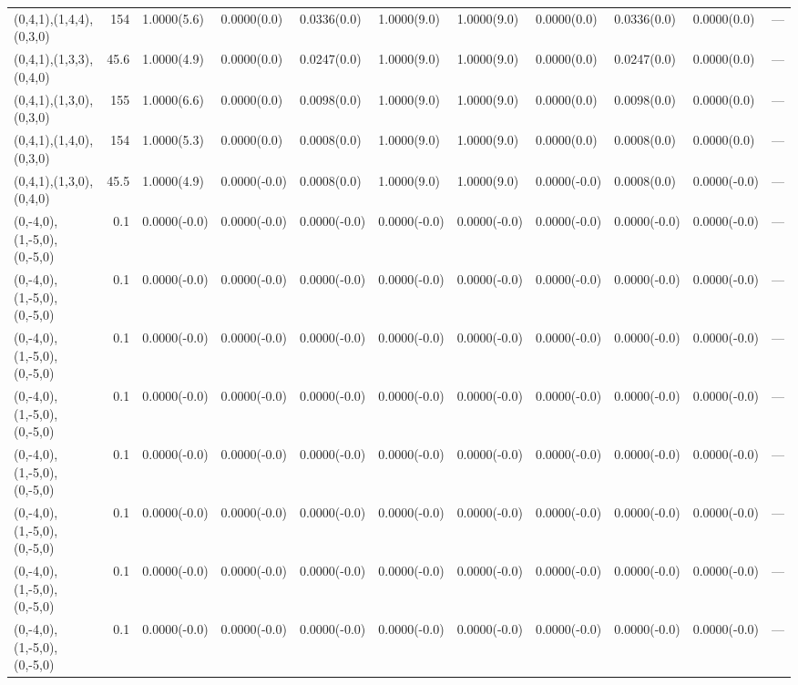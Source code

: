 \begin{tabular}{lrlllllllll}
 (0,4,1),(1,4,4),(0,3,0)    &  154   & 1.0000(5.6)  & 0.0000(0.0)  & 0.0336(0.0)  & 1.0000(9.0)    & 1.0000(9.0)  & 0.0000(0.0)    & 0.0336(0.0)  & 0.0000(0.0)  & ---    \\
 (0,4,1),(1,3,3),(0,4,0)    &   45.6 & 1.0000(4.9)  & 0.0000(0.0)  & 0.0247(0.0)  & 1.0000(9.0)    & 1.0000(9.0)  & 0.0000(0.0)    & 0.0247(0.0)  & 0.0000(0.0)  & ---    \\
 (0,4,1),(1,3,0),(0,3,0)    &  155   & 1.0000(6.6)  & 0.0000(0.0)  & 0.0098(0.0)  & 1.0000(9.0)    & 1.0000(9.0)  & 0.0000(0.0)    & 0.0098(0.0)  & 0.0000(0.0)  & ---    \\
 (0,4,1),(1,4,0),(0,3,0)    &  154   & 1.0000(5.3)  & 0.0000(0.0)  & 0.0008(0.0)  & 1.0000(9.0)    & 1.0000(9.0)  & 0.0000(0.0)    & 0.0008(0.0)  & 0.0000(0.0)  & ---    \\
 (0,4,1),(1,3,0),(0,4,0)    &   45.5 & 1.0000(4.9)  & 0.0000(-0.0) & 0.0008(0.0)  & 1.0000(9.0)    & 1.0000(9.0)  & 0.0000(-0.0)   & 0.0008(0.0)  & 0.0000(-0.0) & ---    \\
 (0,-4,0),(1,-5,0),(0,-5,0) &    0.1 & 0.0000(-0.0) & 0.0000(-0.0) & 0.0000(-0.0) & 0.0000(-0.0)   & 0.0000(-0.0) & 0.0000(-0.0)   & 0.0000(-0.0) & 0.0000(-0.0) & ---    \\
 (0,-4,0),(1,-5,0),(0,-5,0) &    0.1 & 0.0000(-0.0) & 0.0000(-0.0) & 0.0000(-0.0) & 0.0000(-0.0)   & 0.0000(-0.0) & 0.0000(-0.0)   & 0.0000(-0.0) & 0.0000(-0.0) & ---    \\
 (0,-4,0),(1,-5,0),(0,-5,0) &    0.1 & 0.0000(-0.0) & 0.0000(-0.0) & 0.0000(-0.0) & 0.0000(-0.0)   & 0.0000(-0.0) & 0.0000(-0.0)   & 0.0000(-0.0) & 0.0000(-0.0) & ---    \\
 (0,-4,0),(1,-5,0),(0,-5,0) &    0.1 & 0.0000(-0.0) & 0.0000(-0.0) & 0.0000(-0.0) & 0.0000(-0.0)   & 0.0000(-0.0) & 0.0000(-0.0)   & 0.0000(-0.0) & 0.0000(-0.0) & ---    \\
 (0,-4,0),(1,-5,0),(0,-5,0) &    0.1 & 0.0000(-0.0) & 0.0000(-0.0) & 0.0000(-0.0) & 0.0000(-0.0)   & 0.0000(-0.0) & 0.0000(-0.0)   & 0.0000(-0.0) & 0.0000(-0.0) & ---    \\
 (0,-4,0),(1,-5,0),(0,-5,0) &    0.1 & 0.0000(-0.0) & 0.0000(-0.0) & 0.0000(-0.0) & 0.0000(-0.0)   & 0.0000(-0.0) & 0.0000(-0.0)   & 0.0000(-0.0) & 0.0000(-0.0) & ---    \\
 (0,-4,0),(1,-5,0),(0,-5,0) &    0.1 & 0.0000(-0.0) & 0.0000(-0.0) & 0.0000(-0.0) & 0.0000(-0.0)   & 0.0000(-0.0) & 0.0000(-0.0)   & 0.0000(-0.0) & 0.0000(-0.0) & ---    \\
 (0,-4,0),(1,-5,0),(0,-5,0) &    0.1 & 0.0000(-0.0) & 0.0000(-0.0) & 0.0000(-0.0) & 0.0000(-0.0)   & 0.0000(-0.0) & 0.0000(-0.0)   & 0.0000(-0.0) & 0.0000(-0.0) & ---    \\

\end{tabular}
